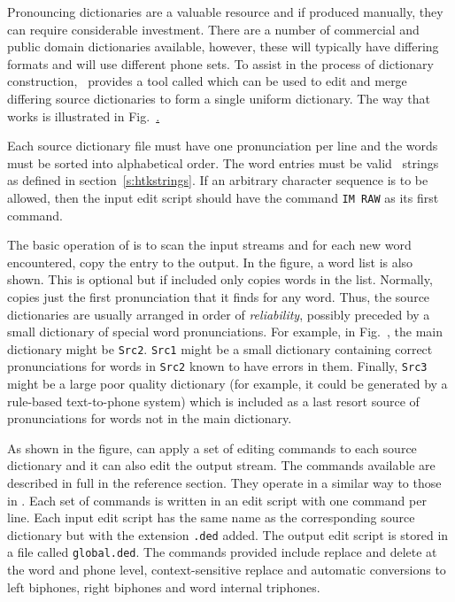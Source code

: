 
Pronouncing dictionaries are a valuable resource and if produced
manually, they can require considerable investment.  There are
a number of commercial and public domain dictionaries available,
however, these will typically have differing formats and will
use different phone sets.  To assist in the process of
dictionary construction, \HTK\ provides a tool called 
which can be used to edit and merge differing source dictionaries
to form a single uniform dictionary.  The way that
 works is illustrated in Fig.~\href{f:dmaker}.

Each source dictionary file must have one pronunciation per line and the
words must be sorted into alphabetical order.  The word entries must be
valid \HTK\ strings as defined in section~\ref{s:htkstrings}.  If an
arbitrary character sequence is to be allowed, then the input edit
script should have the command \texttt{IM RAW} as its first command.

The basic operation of 
 is to scan the input streams and for each new word
encountered, copy the entry to the output.  In the figure,  a word list
is also shown.  This is optional but if included 
 only copies words in the list.  Normally, 
copies just the first pronunciation that it finds for any word. Thus,
the source dictionaries are usually arranged in order of
\textit{reliability}, possibly preceded by a small dictionary of special
word pronunciations. For example, in Fig.~\href{f:dmaker}, the main
dictionary might be \texttt{Src2}.  \texttt{Src1} might be a small 
dictionary containing correct pronunciations for words in \texttt{Src2}
known to have  errors in them. Finally, \texttt{Src3} might be a large
poor quality dictionary (for example, it could be generated
by a rule-based text-to-phone system) which is included as a last resort
source of pronunciations for words not in the main dictionary.

As shown in the figure,  can apply a set of editing
commands to each source dictionary and it can also edit the
output stream.  The commands available are described in full in
the reference section.  They operate in a similar way to
those in .  Each set of commands is written in
an edit script with one command per line.  Each input edit script
has the same name as the corresponding source dictionary but with
the extension \texttt{.ded} added.  The output edit script is stored
in a file called \texttt{global.ded}.  
The commands provided
include replace and delete at the word and phone level, context-sensitive
replace and automatic conversions to left biphones, right biphones
and word internal triphones.

